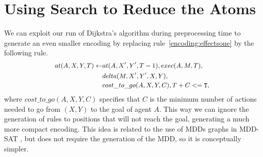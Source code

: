 \section{Using Search to Reduce the Atoms}
We can exploit our run of Dijkstra's algorithm during preprocessing time to generate an even smaller encoding by replacing rule~\eqref{encoding:effectsone} by the following rule.
\begin{equation}\small
  \begin{split}
    at(A,X,Y,T) \leftarrow &at(A,X',Y',T-1), exec(A,M,T),\\
    &delta(M,X',Y',X,Y), \\
    &cost\_to\_go(A,X,Y,C), T + C <= \mathtt{T},
  \end{split}
\end{equation}
where $cost\_to\_go(A,X,Y,C)$ specifies that $C$ is the minimum number of actions needed to go from $(X,Y)$ to the goal of agent $A$. This way we can ignore the generation of rules to positions that will not reach the goal, generating a much more compact encoding. This idea is related to the use of MDDs graphs in MDD-SAT \cite{SurynekFSB16}, but does not require the generation of the MDD, so it is conceptually simpler.
